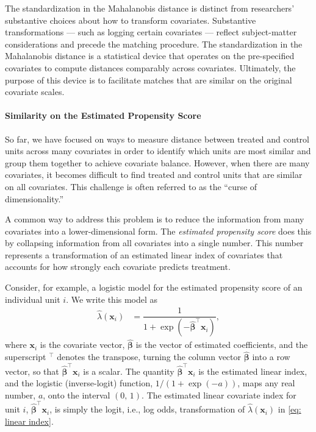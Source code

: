 \documentclass[
  12pt,
  leqno]{article}
\begin{document}
\doublespacing

The standardization in the Mahalanobis distance is distinct from
researchers' substantive choices about how to transform covariates.
Substantive transformations --- such as logging certain covariates ---
reflect subject-matter considerations and precede the matching
procedure. The standardization in the Mahalanobis distance is a
statistical device that operates on the pre-specified covariates to
compute distances comparably across covariates. Ultimately, the purpose
of this device is to facilitate matches that are similar on the original
covariate scales.

\paragraph{Similarity on the Estimated Propensity
Score}\label{similarity-on-the-estimated-propensity-score}

So far, we have focused on ways to measure distance between treated and
control units across many covariates in order to identify which units
are most similar and group them together to achieve covariate balance.
However, when there are many covariates, it becomes difficult to find
treated and control units that are similar on all covariates. This
challenge is often referred to as the ``curse of dimensionality.''

A common way to address this problem is to reduce the information from
many covariates into a lower-dimensional form. The \emph{estimated
propensity score} does this by collapsing information from all
covariates into a single number. This number represents a transformation
of an estimated linear index of covariates that accounts for how
strongly each covariate predicts treatment.

Consider, for example, a logistic model for the estimated propensity
score of an individual unit \(i\). We write this model as
\begin{align} \label{eq: linear index}
\hat{\lambda}(\bm{x}_i) & = \dfrac{1}{1 + \exp(-\bm{\hat{\beta}}^{\top}\bm{x}_i)},
\end{align} where \(\bm{x}_i\) is the covariate vector,
\(\bm{\hat{\beta}}\) is the vector of estimated coefficients, and the
superscript \(^{\top}\) denotes the transpose, turning the column vector
\(\bm{\hat{\beta}}\) into a row vector, so that
\(\bm{\hat{\beta}}^{\top}\bm{x}_i\) is a scalar. The quantity
\(\bm{\hat{\beta}}^{\top}\bm{x}_i\) is the estimated linear index, and
the logistic (inverse-logit) function, \(1 / (1 + \exp(-a))\), maps any
real number, \(a\), onto the interval \((0, \, 1)\). The estimated
linear covariate index for unit \(i\),
\(\bm{\hat{\beta}}^{\top}\bm{x}_i\), is simply the logit, i.e., log
odds, transformation of \(\hat{\lambda}(\bm{x}_i)\) in
\eqref{eq: linear index}.
\end{document}

